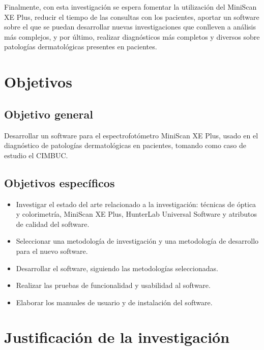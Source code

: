 Finalmente, con esta investigaci\'{o}n se espera fomentar la utilizaci\'{o}n del \mbox{MiniScan} XE Plus, reducir el tiempo de las consultas con los pacientes, aportar un software sobre el que se puedan desarrollar nuevas investigaciones que conlleven a an\'{a}lisis m\'{a}s complejos, y por \'{u}ltimo, realizar diagn\'{o}sticos m\'{a}s completos y diversos sobre patolog\'{i}as dermatol\'{o}gicas presentes en pacientes.

	\section{Objetivos}

		\subsection{Objetivo general}
	Desarrollar un software para el espectrofot\'{o}metro MiniScan XE Plus, usado en el diagn\'{o}stico de patolog\'{i}as dermatol\'{o}gicas en pacientes, tomando como caso de estudio el CIMBUC.
		\subsection{Objetivos espec\'{i}ficos}
			\begin{itemize}
				\item Investigar el estado del arte relacionado a la investigaci\'{o}n: t\'{e}cnicas de \'{o}ptica y colorimetr\'{i}a, MiniScan XE Plus, HunterLab Universal Software y atributos de calidad del software.
				
				\item Seleccionar una metodolog\'{i}a de investigaci\'{o}n y una metodolog\'{i}a de desarrollo para el nuevo software.
				
				\item Desarrollar el software, siguiendo las metodolog\'{i}as \mbox{seleccionadas}.
				
				\item Realizar las pruebas de funcionalidad y usabilidad al software.
				
				\item Elaborar los manuales de usuario y de instalaci\'{o}n del software.
			\end{itemize}
\newpage
	\section{Justificaci\'{o}n de la investigaci\'{o}n}
	
